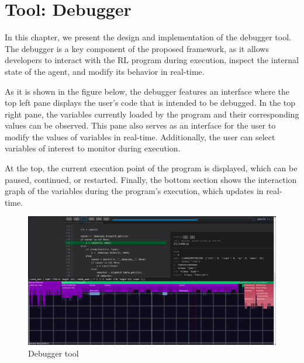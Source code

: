 
\chapter{Tool: Debugger}
\label{cha:debugger}

In this chapter, we present the design and implementation of the debugger tool.
The debugger is a key component of the proposed framework, as it allows 
developers to interact with the RL program during execution, inspect the 
internal state of the agent, and modify its behavior in real-time.

As it is shown in the figure below, the debugger features an interface where 
the top left pane displays the user's code that is intended to be debugged. 
In the top right pane, the variables currently loaded by the program and their 
corresponding values can be observed. This pane also serves as an interface for 
the user to modify the values of variables in real-time. Additionally, the user 
can select variables of interest to monitor during execution.

At the top, the current execution point of the program is displayed, which 
can be paused, continued, or restarted. Finally, the bottom section shows 
the interaction graph of the variables during the program's execution, which 
updates in real-time.

\begin{figure}[h]
    \centering
    \includegraphics[width=1\textwidth]{figures/tool.png}
    \caption{Debugger tool}
    \label{fig:debugger}
\end{figure}


\endinput